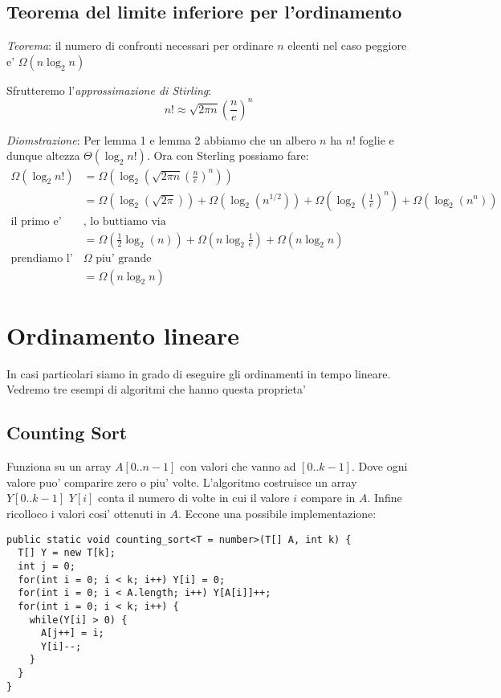 \documentclass{article}
\begin{document}
\subsection{Teorema del limite inferiore per l'ordinamento}

\emph{Teorema}: il numero di confronti necessari per ordinare $n$ eleenti nel
caso peggiore e' $\Omega(n \log_2 n)$

Sfrutteremo l'\emph{approssimazione di Stirling}:
\begin{equation*}
n! \approx \sqrt{2 \pi n}(\frac{n}{e})^n
\end{equation*}

\emph{Diomstrazione}: Per lemma 1 e lemma 2 abbiamo che un albero $n$ ha $n!$
foglie e dunque altezza $\Theta(\log_2 n!)$. Ora con Sterling possiamo fare:
\begin{align*}
  \Omega(\log_2 n!) &= \Omega(\log_2(\sqrt{2 \pi n}(\frac{n}{e})^n)) \\
  &= \Omega(\log_2(\sqrt{2 \pi})) + \Omega(\log_2(n^{1/2}))
    + \Omega(\log_2(\frac{1}{e})^n) + \Omega(\log_2(n^n)) \\
    \text{il primo e' costante} &\text{, lo buttiamo via} \\
  &= \Omega(\frac{1}{2} \log_2(n)) + \Omega(n\log_2 \frac{1}{e})
    + \Omega(n \log_2 n) \\
    \text{prendiamo l'} &\Omega \text{ piu' grande} \\
  &= \Omega(n \log_2 n)
\end{align*}

\section{Ordinamento lineare}

In casi particolari siamo in grado di eseguire gli ordinamenti in tempo lineare.
Vedremo tre esempi di algoritmi che hanno questa proprieta'

\subsection{Counting Sort}

Funziona su un array $A[0..n-1]$ con valori che vanno ad $[0..k-1]$. Dove ogni
valore puo' comparire zero o piu' volte. L'algoritmo costruisce un array $Y[0..k-1]$
$Y[i]$ conta il numero di volte in cui il valore $i$ compare in $A$.
Infine ricolloco i valori cosi' ottenuti in $A$. Eccone una possibile implementazione:

\begin{lstlisting}
public static void counting_sort<T = number>(T[] A, int k) {
  T[] Y = new T[k];
  int j = 0;
  for(int i = 0; i < k; i++) Y[i] = 0;
  for(int i = 0; i < A.length; i++) Y[A[i]]++;
  for(int i = 0; i < k; i++) {
    while(Y[i] > 0) {
      A[j++] = i;
      Y[i]--;
    }
  }
}
\end{lstlisting}
\end{document}

